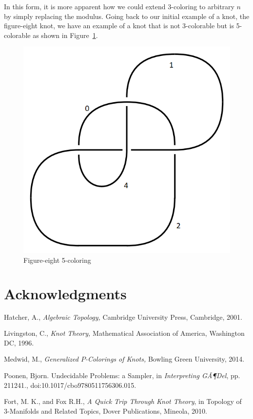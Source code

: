 \documentclass[12pt]{amsart}
\theoremstyle{definition}
\theoremstyle{remark}
\numberwithin{equation}{section}
\newcommand{\ds}{.3}
\begin{document}
In this form, it is more apparent how we could extend $3$-coloring
to arbitrary $n$ by simply replacing the modulus. Going back
to our initial example of a knot, the figure-eight knot, we have
an example of a knot that is not $3$-colorable but is 5-colorable
as shown in Figure~\ref{fig:figure-eight-c}.

\begin{figure}
  \includegraphics[scale=\ds]{figure-eight-c}
  \caption{Figure-eight 5-coloring}
  \label{fig:figure-eight-c}
\end{figure}

\section*{Acknowledgments}
\begin{thebibliography}{99}

  Hatcher, A., \textit{Algebraic Topology,}
  Cambridge University Press, Cambridge, 2001. 
  
  Livingston, C., \textit{Knot Theory,}
  Mathematical Association of America, Washington DC, 1996. 
  
  Medwid, M., \textit{Generalized $P$-Colorings of Knots,}
  Bowling Green University, 2014.
  
  Poonen, Bjorn. Undecidable Problems: a Sampler, in
  \textit{Interpreting GÃ¶Del}, pp. 211241., doi:10.1017/cbo9780511756306.015.
  
  Fort, M. K., and Fox R.H.,
  \textit{A Quick Trip Through Knot Theory}, in Topology of 3-Manifolds and
  Related Topics, Dover Publications, Mineola, 2010.
\end{thebibliography}
\end{document}

